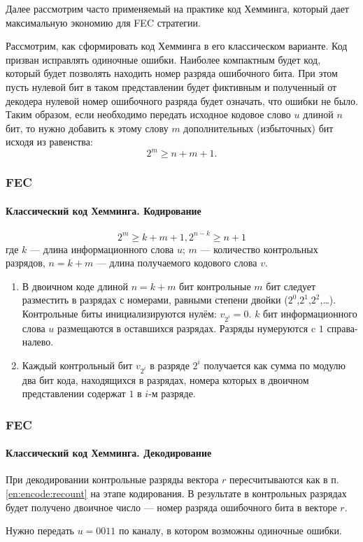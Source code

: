 Далее рассмотрим часто применяемый на практике код Хемминга, который дает максимальную экономию для FEC стратегии.

Рассмотрим, как сформировать код Хемминга в его классическом варианте. Код призван исправлять одиночные ошибки. Наиболее компактным будет код, который будет позволять находить номер разряда ошибочного бита. При этом пусть нулевой бит в таком представлении будет фиктивным и полученный от декодера нулевой номер ошибочного разряда будет означать, что ошибки не было. Таким образом, если необходимо передать исходное кодовое слово $u$ длиной $n$ бит, то нужно добавить к этому слову $m$ дополнительных (избыточных) бит исходя из равенства:
\[2^m\geq n+m+1.\]

\begin{frame}
    \frametitle{FEC}
    \framesubtitle{Классический код Хемминга. Кодирование}
    
    \[2^m\geq k+m+1, 2^{n-k}\geq n+1\] где $k$ --- длина информационного слова $u$; $m$ --- количество контрольных разрядов, $n=k+m$ --- длина получаемого кодового слова $v$.
    \begin{enumerate}
        \item В двоичном коде длиной $n=k+m$ бит контрольные $m$ бит следует разместить в разрядах с номерами, равными степени двойки ($2^0$,$2^1$,$2^2$,\ldots). Контрольные биты инициализируются нулём: $v_{2^i}=0$. $k$ бит информационного слова $u$ размещаются в оставшихся разрядах. Разряды нумеруются c $1$ справа-налево.
        
        \item \label{en:encode:recount} Каждый контрольный бит $v_{2^i}$ в разряде $2^i$ получается как сумма по модулю два бит кода, находящихся в разрядах, номера которых в двоичном представлении содержат $1$ в $i$-м разряде.
    \end{enumerate}
\end{frame}


\begin{frame}
    \frametitle{FEC}
    \framesubtitle{Классический код Хемминга. Декодирование}
    
    При декодировании контрольные разряды вектора $r$ пересчитываются как в п. \ref{en:encode:recount} на этапе кодирования. В результате в контрольных разрядах будет получено двоичное число --- номер разряда ошибочного бита в векторе $r$.
    \begin{example}
        Нужно передать $u=0011$ по каналу, в котором возможны одиночные ошибки.
    \end{example}
\end{frame}


